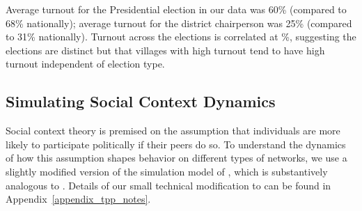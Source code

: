 \documentclass[12pt]{article}
\begin{document}



Average turnout for the Presidential election in our data was 60\% (compared to 68\% nationally); average turnout for the district chairperson was 25\% (compared to 31\% nationally). Turnout across the elections is correlated at \unskip\%, suggesting the elections are distinct but that villages with high turnout tend to have high turnout independent of election type.

%
\subsection{Simulating Social Context Dynamics}\label{section_simulation}

Social context theory is premised on the assumption that individuals are more likely to participate politically if their peers do so. To understand the dynamics of how this assumption shapes behavior on different types of networks, we use a slightly modified version of the simulation model of \cite{Siegel:2009vi}, which is substantively analogous to \cite{Rolfe:2012ka}. Details of our small technical modification to \cite{Siegel:2009vi} can be found in Appendix~\ref{appendix_tpp_notes}.
\end{document}
